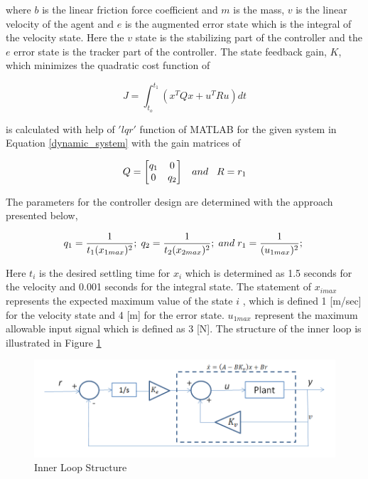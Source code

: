 where $b$ is the linear friction force coefficient and $m$ is the mass, $v$  is the linear velocity of the agent and $e$ is the augmented error state which is the integral of the velocity state. Here the $v$ state is the stabilizing part of the controller and the $e$ error state is the tracker part of the controller. The state feedback gain, $K$, which minimizes the quadratic cost function of

\begin{equation}
J = \int_{t_o}^{t_1}(x^TQx + u^TRu) dt
\end{equation}

is calculated with help of $'lqr'$ function of MATLAB for the given system in Equation \ref{dynamic_system} with the gain matrices of 

\begin{equation}
Q = \begin{bmatrix}
q_1 & 0 \\ 0 & q_2
\end{bmatrix}
\hspace{0.3cm} and
\hspace{0.3cm}
R = r_1
\end{equation}

The parameters for the controller design are determined with the approach presented below,

\begin{equation}
q_1 = \frac{1}{t_1 (x_{1max})^2}; \hspace{0.1cm}
q_2 = \frac{1}{t_2 (x_{2max})^2}; \hspace{0.1cm} and \hspace{0.1cm}
r_1 = \frac{1}{ (u_{1max})^2}; \hspace{0.1cm}
\end{equation}

Here $t_i$  is the desired settling time for $x_i$ which is determined as 1.5 seconds for the velocity and 0.001 seconds for the integral state. The statement of $x_{imax}$ represents the expected maximum value of the state $i$ , which is defined 1 [m/sec] for the velocity state and 4 [m] for the error state. $u_{1max}$ represent the maximum allowable input signal which is defined as 3 [N]. The structure of the inner loop is illustrated in Figure \ref{innerloopref}

\begin{figure}[H]
\caption{Inner Loop Structure} \label{innerloopref}
\centering
\includegraphics[scale = 0.50]{inner_loop}
\end{figure}

